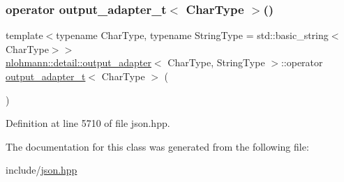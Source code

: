 \subsubsection{\texorpdfstring{operator output\+\_\+adapter\+\_\+t$<$ Char\+Type $>$()}{operator output\_adapter\_t< CharType >()}}
{\footnotesize\ttfamily template$<$typename Char\+Type, typename String\+Type = std\+::basic\+\_\+string$<$\+Char\+Type$>$$>$ \\
\hyperlink{classnlohmann_1_1detail_1_1output__adapter}{nlohmann\+::detail\+::output\+\_\+adapter}$<$ Char\+Type, String\+Type $>$\+::operator \hyperlink{namespacenlohmann_1_1detail_a9b680ddfb58f27eb53a67229447fc556}{output\+\_\+adapter\+\_\+t}$<$ Char\+Type $>$ (\begin{DoxyParamCaption}{ }\end{DoxyParamCaption})\hspace{0.3cm}{\ttfamily [inline]}}



Definition at line 5710 of file json.\+hpp.



The documentation for this class was generated from the following file\+:\begin{DoxyCompactItemize}
\item 
include/\hyperlink{json_8hpp}{json.\+hpp}\end{DoxyCompactItemize}
